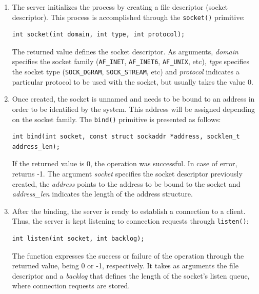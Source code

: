 \begin{enumerate}
\item The server initializes the process by creating a file descriptor (socket descriptor). This process is accomplished through the \texttt{socket()} primitive:

\begin{lstlisting}[style=CInputStyle]
int socket(int domain, int type, int protocol);
\end{lstlisting}

The returned value defines the socket descriptor. As arguments, \textit{domain} specifies the socket family (\texttt{AF\_INET}, \texttt{AF\_INET6}, \texttt{AF\_UNIX}, etc), \textit{type} specifies the socket type (\texttt{SOCK\_DGRAM}, \texttt{SOCK\_STREAM}, etc) and \textit{protocol} indicates a particular protocol to be used with the socket, but usually takes the value 0.

\item Once created, the socket is unnamed and needs to be bound to an address in order to be identified by the system. This address will be assigned depending on the socket family. The \texttt{bind()} primitive is presented as follows:

\begin{lstlisting}[style=CInputStyle]
int bind(int socket, const struct sockaddr *address, socklen_t address_len);
\end{lstlisting}

If the returned value is 0, the operation was successful. In case of error, returns -1. The argument \textit{socket} specifies the socket descriptor previously created, the \textit{address} points to the address to be bound to the socket and \textit{address\_len} indicates the length of the address structure.

\item After the binding, the server is ready to establish a connection to a client. Thus, the server is kept listening to connection requests through \texttt{listen()}:

\begin{lstlisting}[style=CInputStyle]
int listen(int socket, int backlog);
\end{lstlisting}

The function expresses the success or failure of the operation through the returned value, being 0 or -1, respectively. It takes as arguments the file descriptor and a \textit{backlog} that defines the length of the socket's listen queue, where connection requests are stored.


\end{enumerate}
